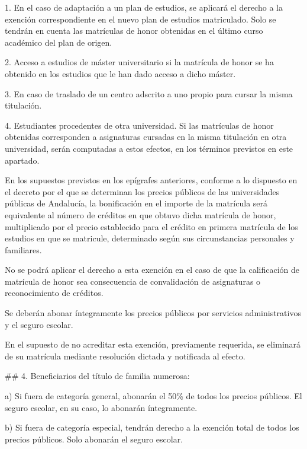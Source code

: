 \documentclass{article}
\begin{document}
\begin{itemize}
\begin{itemize}
\begin{scriptsize}
                  1. En el caso de adaptación a un plan de estudios, se aplicará el derecho a la exención correspondiente en el nuevo plan de estudios matriculado. Solo se tendrán en cuenta las matrículas de honor obtenidas en el último curso académico del plan de origen.

                  2. Acceso a estudios de máster universitario si la matrícula de honor se ha obtenido en los estudios que le han dado acceso a dicho máster.

                  3. En caso de traslado de un centro adscrito a uno propio para cursar la misma titulación.

                  4. Estudiantes procedentes de otra universidad. Si las matrículas de honor obtenidas corresponden a asignaturas cursadas en la misma titulación en otra universidad, serán computadas a estos efectos, en los términos previstos en este apartado.

                  En los supuestos previstos en los epígrafes anteriores, conforme a lo dispuesto en el decreto por el que se determinan los precios públicos de las universidades públicas de Andalucía, la bonificación en el importe de la matrícula será equivalente al número de créditos en que obtuvo dicha matrícula de honor, multiplicado por el precio establecido para el crédito en primera matrícula de los estudios en que se matricule, determinado según sus circunstancias personales y familiares.

                  No se podrá aplicar el derecho a esta exención en el caso de que la calificación de matrícula de honor sea consecuencia de convalidación de asignaturas o reconocimiento de créditos.

                  Se deberán abonar íntegramente los precios públicos por servicios administrativos y el seguro escolar.

                  En el supuesto de no acreditar esta exención, previamente requerida, se eliminará de su matrícula mediante resolución dictada y notificada al efecto.

                  \#\# 4. Beneficiarios del título de familia numerosa:

                  a) Si fuera de categoría general, abonarán el 50\% de todos los precios públicos. El seguro escolar, en su caso, lo abonarán íntegramente.

                  b) Si fuera de categoría especial, tendrán derecho a la exención total de todos los precios públicos. Solo abonarán el seguro escolar.


\end{scriptsize}
\end{itemize}
\end{itemize}
\end{document}
